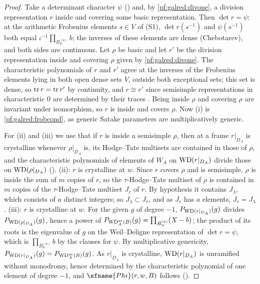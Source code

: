 \begin{proof}
Take a determinant character $\psi$ () and, by \cref{pf:galred:divone}, a
division representation $r$ inside and covering some basic representation. Then $\det r=\psi$: at the arithmetic Frobenius
elements $s\in V$ of (S1), $\det r(s^{-1})$ and $\psi(s^{-1})$ both equal $\iota^{-1}\prod_{B^{(a)}_w}b$; the inverses of these
elements are dense (Chebotarev), and both sides are continuous. Let $\rho$ be basic and let $r'$ be the division
representation inside and covering $\rho$ given by \cref{pf:galred:divone}. The characteristic polynomials of $r$ and $r'$
agree at the inverses of the Frobenius elements lying in both open dense sets $V$, outside both exceptional sets; this set
is dense, so $\operatorname{tr} r=\operatorname{tr} r'$ by continuity, and $r\cong r'$ since semisimple representations in characteristic $0$
are determined by their traces \cite[(30.16)]{CurtisReiner1962}. Being inside $\rho$ and covering $\rho$ are invariant under
isomorphism, so $r$ is inside and covers $\rho$. Now (i) is \cref{pf:galred:frobcond}, as generic Satake parameters are
multiplicatively generic.

For (ii) and (iii) we use that if $r$ is inside a semisimple $\rho$, then at a frame $r|_{D_A}$ is crystalline whenever
$\rho|_{D_A}$ is, its Hodge--Tate multisets are contained in those of $\rho$, and the characteristic polynomials of elements of
$W_A$ on $\mathrm{WD}(r|_{D_A})$ divide those on $\mathrm{WD}(\rho|_{D_A})$ ().
(ii): $r$ is crystalline at $w$. Since $r$ covers $\rho$ and is semisimple, $\rho$ is inside the sum of $m$ copies of $r$, so
the $\tau$-Hodge--Tate multiset of $\rho$ is contained in $m$ copies of the $\tau$-Hodge--Tate multiset $J_r$ of $r$. By
hypothesis it contains $J_\lambda$, which consists of $a$ distinct integers; so $J_\lambda\subset J_r$, and as $J_r$ has $a$
elements, $J_r=J_\lambda$. (iii): $r$ is crystalline at $w$. For the given $g$
of degree $-1$, $P_{\mathrm{WD}(r|_{D_A})}(g)$ divides $P_{\mathrm{WD}(\rho|_{D_A})}(g)$, hence a power of
$P_{\mathrm{WD}^{\mathrm{ur}}_A(B)}(g)=\prod_{B^{(a)}_w}(X-b)$; the product of its roots is the eigenvalue of $g$ on the Weil--Deligne
representation of $\det r=\psi$, which is $\prod_{B^{(a)}_w}b$ by the clauses for $\psi$. By multiplicative genericity,
$P_{\mathrm{WD}(r|_{D_A})}(g)=P_{\mathrm{WD}^{\mathrm{ur}}_A(B)}(g)$. As $r|_{D_A}$ is crystalline, $\mathrm{WD}(r|_{D_A})$ is unramified without
monodromy, hence determined by the characteristic polynomial of one element of degree $-1$, and $\sfname{Phi}(r,w,B)$ follows
().
\end{proof}

